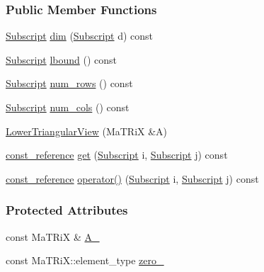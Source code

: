 \subsubsection*{Public Member Functions}
\begin{DoxyCompactItemize}
\item 
\hyperlink{namespace_t_n_t_af22e3f1460e145c04ce4e7d701e4c1c1}{Subscript} \hyperlink{class_t_n_t_1_1_lower_triangular_view_a64ccef6b736968fb59c729069dcea9a9}{dim} (\hyperlink{namespace_t_n_t_af22e3f1460e145c04ce4e7d701e4c1c1}{Subscript} d) const 
\item 
\hyperlink{namespace_t_n_t_af22e3f1460e145c04ce4e7d701e4c1c1}{Subscript} \hyperlink{class_t_n_t_1_1_lower_triangular_view_a327274218174e960f7841cb02fc78965}{lbound} () const 
\item 
\hyperlink{namespace_t_n_t_af22e3f1460e145c04ce4e7d701e4c1c1}{Subscript} \hyperlink{class_t_n_t_1_1_lower_triangular_view_abfd94f76d69203201b04db6dd89ba810}{num\_\-rows} () const 
\item 
\hyperlink{namespace_t_n_t_af22e3f1460e145c04ce4e7d701e4c1c1}{Subscript} \hyperlink{class_t_n_t_1_1_lower_triangular_view_ac43320a161f0e094a97677fc9006eb7b}{num\_\-cols} () const 
\item 
\hyperlink{class_t_n_t_1_1_lower_triangular_view_a54014b50482d1e90cedc19b2dbf20269}{LowerTriangularView} (MaTRiX \&A)
\item 
\hyperlink{class_t_n_t_1_1_lower_triangular_view_a5f1897676c05bb6efef1010f32d507b9}{const\_\-reference} \hyperlink{class_t_n_t_1_1_lower_triangular_view_a335c19210c8efdf303cbae89d009f25c}{get} (\hyperlink{namespace_t_n_t_af22e3f1460e145c04ce4e7d701e4c1c1}{Subscript} i, \hyperlink{namespace_t_n_t_af22e3f1460e145c04ce4e7d701e4c1c1}{Subscript} j) const 
\item 
\hyperlink{class_t_n_t_1_1_lower_triangular_view_a5f1897676c05bb6efef1010f32d507b9}{const\_\-reference} \hyperlink{class_t_n_t_1_1_lower_triangular_view_a043b9ef7c1236d693f1f24d588e8c2c7}{operator()} (\hyperlink{namespace_t_n_t_af22e3f1460e145c04ce4e7d701e4c1c1}{Subscript} i, \hyperlink{namespace_t_n_t_af22e3f1460e145c04ce4e7d701e4c1c1}{Subscript} j) const 
\end{DoxyCompactItemize}
\subsubsection*{Protected Attributes}
\begin{DoxyCompactItemize}
\item 
const MaTRiX \& \hyperlink{class_t_n_t_1_1_lower_triangular_view_ac334eb0cb5c6d100cf8dd1424914517a}{A\_\-}
\item 
const MaTRiX::element\_\-type \hyperlink{class_t_n_t_1_1_lower_triangular_view_a4028ec2cebcf9777ddba981604ee253b}{zero\_\-}
\end{DoxyCompactItemize}


